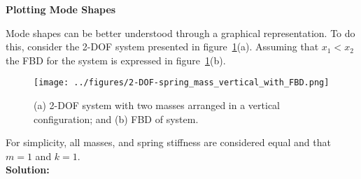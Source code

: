 \documentclass[12pt,letter]{article}
\begin{document}
	\begin{example}

	\textbf{Plotting Mode Shapes}

	\noindent Mode shapes can be better understood through a graphical representation. To do this, consider the 2-DOF system presented in figure~\ref{fig:2-DOF-spring_mass_vertical}(a). Assuming that $x_1<x_2$ the FBD for the system is expressed in figure~\ref{fig:2-DOF-spring_mass_vertical}(b).
	
	\begin{figure}[H]
		\centering
		\texttt{[image: ../figures/2-DOF-spring\_mass\_vertical\_with\_FBD.png]}
		\caption{(a) 2-DOF system with two masses arranged in a vertical configuration; and (b) FBD of system.}
		\label{fig:2-DOF-spring_mass_vertical}
	\end{figure}
	\noindent For simplicity, all masses, and spring stiffness are considered equal and that $m=1$ and $k=1$. \\

	\noindent \textbf{Solution:} 


\end{example}
\end{document}
